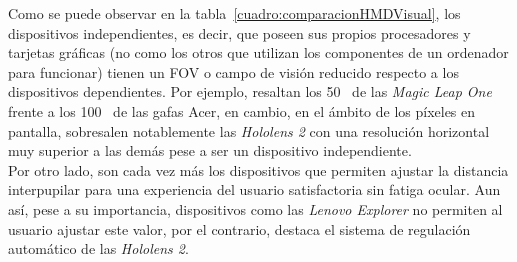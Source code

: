 Como se puede observar en la tabla~\ref{cuadro:comparacionHMDVisual}, los dispositivos independientes, es decir, que poseen sus propios procesadores y tarjetas gráficas (no como los otros que utilizan los componentes de un ordenador para funcionar) tienen un FOV o campo de visión reducido respecto a los dispositivos dependientes. Por ejemplo, resaltan los 50\degree~  de las \textit{Magic Leap One} frente a los 100\degree~  de las gafas Acer, en cambio, en el ámbito de los píxeles en pantalla, sobresalen notablemente las \textit{Hololens 2} con una resolución horizontal muy superior a las demás pese a ser un dispositivo independiente.\\

Por otro lado, son cada vez más los dispositivos que permiten ajustar la distancia interpupilar para una experiencia del usuario satisfactoria sin fatiga ocular. Aun así, pese a su importancia, dispositivos como las \textit{Lenovo Explorer} no permiten al usuario ajustar este valor, por el contrario, destaca el sistema de regulación automático de las \textit{Hololens 2}.\\

\begin{table}[ht]
\caption{Comparación de baterías del casco y los controladores.}
\label{cuadro:comparacionHMDyControladores}
\end{table}

